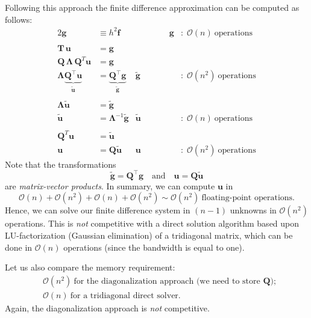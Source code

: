 Following this approach the finite difference approximation can be computed as
follows:
\begin{alignat*}{2}
  \bm g &\equiv  h^2 \bm f \quad &  \qquad \qquad \bm g
  &: \; \mathcal{O}(n) ~ \text{operations} \\
  \\
  \bm T \, \bm u &= \bm g \\
  \bm Q \, \bm \Lambda \, \bm Q^T \bm u &= \bm g \\
  \bm \Lambda \underbrace{\bm Q^\intercal \bm u}_{\tilde{\bm u}}
  &= \underbrace{\bm Q^\intercal \bm g}_{\tilde{\bm g}}
  & \tilde{\bm g} &: \; \mathcal{O}(n^2) ~ \text{operations} \\
  \\
  \bm \Lambda \tilde{\bm u} &= \tilde{\bm g} \\
  \tilde{\bm u} &= \bm \Lambda^{-1} \tilde{\bm g}
  & \tilde{\bm u} &: \; \mathcal{O}(n) ~ \text{operations} \\
  \\
  \bm Q^T \bm u &= \tilde{\bm u} \\
  \bm u &= \bm Q \tilde{\bm u} & \bm u
  &: \; \mathcal{O}(n^2) ~ \text{operations}
\end{alignat*}
Note that the transformations
\begin{equation*}
  \tilde{\bm g} = \bm Q^\intercal \bm g \quad \text{and} \quad \bm u = \bm Q \tilde{\bm u}
\end{equation*}
are \emph{matrix-vector products}. In summary, we can compute $\bm u$ in
\begin{equation*}
  \mathcal{O}(n) + \mathcal{O}(n^2) + \mathcal{O}(n) + \mathcal{O}(n^2)
  \sim \mathcal{O}(n^2) ~ \text{floating-point operations}.
\end{equation*}
Hence, we can solve our finite difference system in $(n-1)$ unknowns in
$\mathcal{O}(n^2)$ operations. This is \emph{not} competitive with a direct
solution algorithm based upon LU-factorization (Gaussian elimination) of a
tridiagonal matrix, which can be done in $\mathcal{O}(n)$ operations (since the
bandwidth is equal to one).

Let us also compare the memory requirement:
\begin{align*}
  &\mathcal{O}(n^2) ~\text{for the diagonalization approach
  (we need to store $\bm Q$)}; \\
  &\mathcal{O}(n) ~\text{for a tridiagonal direct solver}.
\end{align*}
Again, the diagonalization approach is {\em not} competitive.

